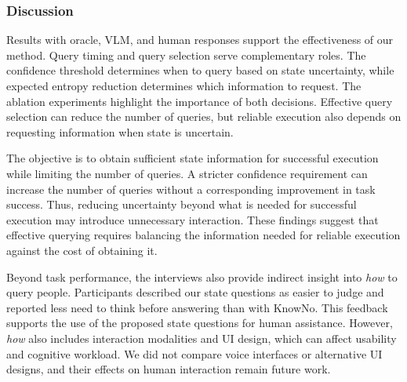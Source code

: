 \subsubsection{Discussion}\label{exp:discussion}

Results with oracle, VLM, and human responses support the effectiveness of our method. Query timing and query selection serve complementary roles. The confidence threshold determines when to query based on state uncertainty, while expected entropy reduction determines which information to request. The ablation experiments highlight the importance of both decisions. Effective query selection can reduce the number of queries, but reliable execution also depends on requesting information when state is uncertain.

The objective is to obtain sufficient state information for successful execution while limiting the number of queries. A stricter confidence requirement can increase the number of queries without a corresponding improvement in task success. Thus, reducing uncertainty beyond what is needed for successful execution may introduce unnecessary interaction. These findings suggest that effective querying requires balancing the information needed for reliable execution against the cost of obtaining it.

Beyond task performance, the interviews also provide indirect insight into \textit{how} to query people. Participants described our state questions as easier to judge and reported less need to think before answering than with KnowNo. This feedback supports the use of the proposed state questions for human assistance. However, \textit{how} also includes interaction modalities and UI design, which can affect usability and cognitive workload. We did not compare voice interfaces or alternative UI designs, and their effects on human interaction remain future work.


